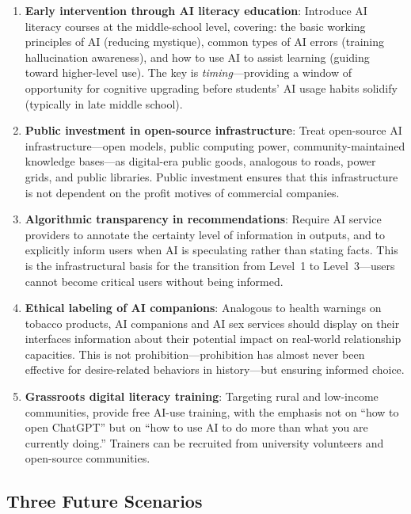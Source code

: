 ﻿\documentclass[12pt,a4paper]{article}
\begin{document}
\begin{enumerate}[label=(\arabic*)]
\item \textbf{Early intervention through AI literacy education}: Introduce AI literacy courses at the middle-school level, covering: the basic working principles of AI (reducing mystique), common types of AI errors (training hallucination awareness), and how to use AI to assist learning (guiding toward higher-level use). The key is \emph{timing}---providing a window of opportunity for cognitive upgrading before students' AI usage habits solidify (typically in late middle school).

\item \textbf{Public investment in open-source infrastructure}: Treat open-source AI infrastructure---open models, public computing power, community-maintained knowledge bases---as digital-era public goods, analogous to roads, power grids, and public libraries. Public investment ensures that this infrastructure is not dependent on the profit motives of commercial companies.

\item \textbf{Algorithmic transparency in recommendations}: Require AI service providers to annotate the certainty level of information in outputs, and to explicitly inform users when AI is speculating rather than stating facts. This is the infrastructural basis for the transition from Level~1 to Level~3---users cannot become critical users without being informed.

\item \textbf{Ethical labeling of AI companions}: Analogous to health warnings on tobacco products, AI companions and AI sex services should display on their interfaces information about their potential impact on real-world relationship capacities. This is not prohibition---prohibition has almost never been effective for desire-related behaviors in history---but ensuring informed choice.

\item \textbf{Grassroots digital literacy training}: Targeting rural and low-income communities, provide free AI-use training, with the emphasis not on ``how to open ChatGPT'' but on ``how to use AI to do more than what you are currently doing.'' Trainers can be recruited from university volunteers and open-source communities.
\end{enumerate}

\subsection{Three Future Scenarios}
\end{document}
